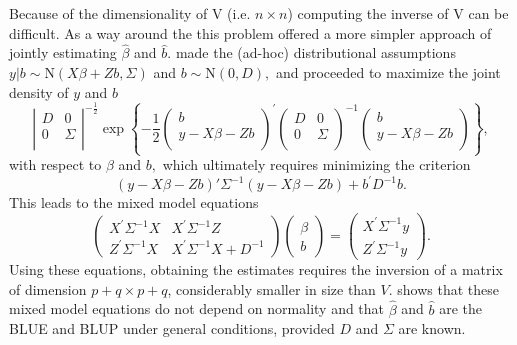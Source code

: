 \documentclass[12pt, a4paper]{report}
\theoremstyle{plain}
\theoremstyle{definition}
\theoremstyle{remark}
\begin{document}
		Because of the dimensionality of V (i.e. $n \times n$) computing the inverse of V can be difficult. As a way around the this problem \citet{Henderson53, Henderson59,Henderson63,Henderson73,Henderson84a} offered a more simpler approach of jointly estimating $\hat{\beta}$ and $\hat{b}$.
		\cite{Henderson:1950} made the (ad-hoc) distributional assumptions $y|b \sim \mathrm{N} (X \beta + Zb, \Sigma)$ and $b \sim \mathrm{N}(0,D),$ and proceeded to maximize the joint density of $y$ and $b$
		\begin{equation}
		\left|
		\begin{array}{cc}
		D & 0 \\
		0 & \Sigma \\
		\end{array}
		\right|^{-\frac{1}{2}}
		\exp
		\left\{ -\frac{1}{2}
		\left(
		\begin{array}{c}
		b \\
		y - X \beta -Zb \\
		\end{array}
		\right)^\prime
		\left( \begin{array}{cc}
		D & 0 \\
		0 & \Sigma \\
		\end{array}\right)^{-1}
		\left(
		\begin{array}{c}
		b \\
		y - X \beta -Zb \\
		\end{array}
		\right)
		\right\},
		\label{u&beta:JointDensity}
		\end{equation}
		with respect to $\beta$ and $b,$ which ultimately requires minimizing the criterion
		\begin{equation}
		(y - X \beta -Zb)'\Sigma^{-1}(y - X \beta -Zb) + b^\prime D^{-1}b.
		\label{Henderson:Criterion}
		\end{equation}
		This leads to the mixed model equations
		\begin{equation}
		\left(\begin{array}{cc}
		X^\prime\Sigma^{-1}X & X^\prime\Sigma^{-1}Z
		\\
		Z^\prime\Sigma^{-1}X & X^\prime\Sigma^{-1}X + D^{-1}
		\end{array}\right)
		\left(\begin{array}{c}
		\beta \\
		b
		\end{array}\right)
		=
		\left(\begin{array}{c}
		X^\prime\Sigma^{-1}y \\
		Z^\prime\Sigma^{-1}y
		\end{array}\right).
		\label{Henderson:Equations}
		\end{equation}
		Using these equations, obtaining the estimates requires the inversion of a matrix
		of dimension $p+q \times p+q$, considerably smaller in size than $V$. \citet{Henderson63} shows that these mixed model equations do not depend on normality and that $\hat{\beta}$ and $\hat{b}$ are the BLUE and BLUP under general conditions, provided $D$ and $\Sigma$ are known.
		
\end{document}

